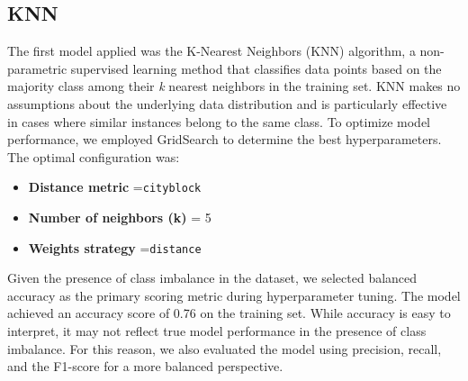 \documentclass[10pt]{article}
\begin{document}
\subsection{KNN}
The first model applied was the K-Nearest Neighbors (KNN) algorithm, a non-parametric supervised learning method that classifies data points based on the majority class among their \textit{k} nearest neighbors in the training set. KNN makes no assumptions about the underlying data distribution and is particularly effective in cases where similar instances belong to the same class. \newline
To optimize model performance, we employed GridSearch to determine the best hyperparameters. The optimal configuration was:
\begin{itemize}
    \item \textbf{Distance metric} =\texttt{cityblock}
    \item \textbf{Number of neighbors (k)} = 5
    \item \textbf{Weights strategy} =\texttt{distance}
\end{itemize}
Given the presence of class imbalance in the dataset, we selected balanced accuracy as the primary scoring metric during hyperparameter tuning. The model achieved an accuracy score of 0.76 on the training set. \newline
While accuracy is easy to interpret, it may not reflect true model performance in the presence of class imbalance. For this reason, we also evaluated the model using precision, recall, and the F1-score for a more balanced perspective.
\end{document}
